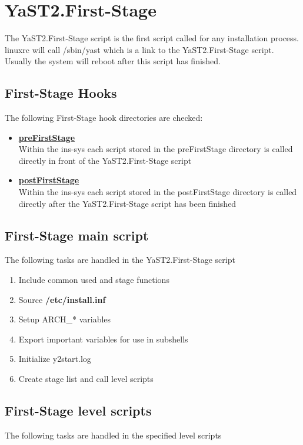 \chapter{YaST2.First-Stage}

The YaST2.First-Stage script is the first script called for any
installation process. linuxrc will call /sbin/yast which is a link
to the YaST2.First-Stage script. Usually the system will reboot after
this script has finished. 

\section{First-Stage Hooks}
The following First-Stage hook directories are checked:

\begin{itemize}
\item \textbf{\underline{preFirstStage}}\\
      Within the ins-sys each script stored in the preFirstStage directory is
      called directly in front of the YaST2.First-Stage script
\item \textbf{\underline{postFirstStage}}\\
      Within the ins-sys each script stored in the postFirstStage directory is
      called directly after the YaST2.First-Stage script has been finished
\end{itemize}

\section{First-Stage main script}
The following tasks are handled in the YaST2.First-Stage script

\begin{enumerate}
\item Include common used and stage functions
\item Source \textbf{/etc/install.inf}
\item Setup ARCH\_* variables
\item Export important variables for use in subshells
\item Initialize y2start.log
\item Create stage list and call level scripts
\end{enumerate}

\newpage

\section{First-Stage level scripts}
The following tasks are handled in the specified level scripts

